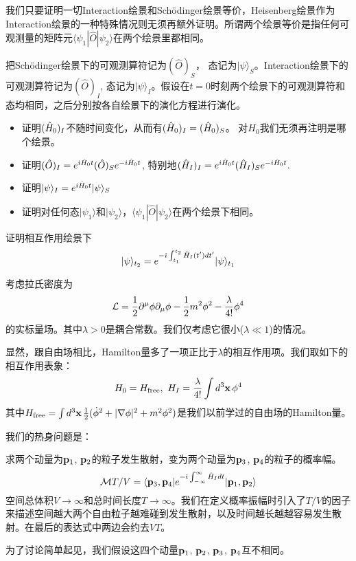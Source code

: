 \documentclass[CJK]{beamer}
\begin{document}
\begin{frame} 
\bch
{\small 
我们只要证明一切Interaction绘景和Sch\"odinger绘景等价，Heisenberg绘景作为Interaction绘景的一种特殊情况则无须再额外证明。所谓两个绘景等价是指任何可观测量的矩阵元$\langle \psi_1 | \hat{O}|\psi_2\rangle$在两个绘景里都相同。
\skipline

把Sch\"odinger绘景下的可观测算符记为$(\hat{O})_S$， 态记为$|\psi\rangle_S$。Interaction绘景下的可观测算符记为$(\hat{O})_I$, 态记为$|\psi\rangle_I$。假设在$t=0$时刻两个绘景下的可观测算符和态均相同，之后分别按各自绘景下的演化方程进行演化。
\begin{itemize}
\item{证明$({\hat{H}}_0)_I$不随时间变化，从而有$({\hat{H}}_0)_I=({\hat{H}}_0)_S$。 对$H_0$我们无须再注明是哪个绘景。}
\item{证明$(\hat{O})_I = e^{{\dot{\imath}}{\hat{H}}_0 t}(\hat{O})_S e^{-{\dot{\imath}}{\hat{H}}_0 t}$, 特别地$({\hat{H}}_I)_I= e^{{\dot{\imath}}{\hat{H}}_0 t}({\hat{H}}_I)_S e^{-{\dot{\imath}}{\hat{H}}_0 t}$.}
\item{证明$|\psi\rangle_I = e^{{\dot{\imath}}{\hat{H}}_0 t} |\psi\rangle_S $}
\item{证明对任何态$|\psi_1\rangle$和$|\psi_2\rangle$，$\langle \psi_1 | \hat{O}|\psi_2\rangle$在两个绘景下相同。}
\end{itemize}
}
\ech
\end{frame}

\begin{frame} 
\bch
证明相互作用绘景下
$$|\psi\rangle_{t_2} = e^{-{\dot{\imath}}\int_{t_1}^{t_2} {\hat{H}}_I(t') dt'} |\psi\rangle_{t_1}$$
\ech
\end{frame}


\begin{frame} 
\bch
考虑拉氏密度为
$${\mathcal{L}} = \frac{1}{2}\partial^\mu\phi\partial_\mu\phi - \frac{1}{2}m^2\phi^2 - \frac{\lambda}{4!}\phi^4$$
的实标量场。其中$\lambda>0$是耦合常数。我们仅考虑它很小($\lambda \ll 1$)的情况。

显然，跟自由场相比，Hamilton量多了一项正比于$\lambda$的相互作用项。我们取如下的相互作用表象：
$$ H_0 = H_{\rm free},\ H_I = \frac{\lambda}{4!} \int d^3{\mathbf{x}}\, \phi^4$$
其中$H_{\rm free} = \int d^3{\mathbf{x}}\, \frac{1}{2}(\dot\phi^2 + |\nabla \phi|^2 + m^2\phi^2)$是我们以前学过的自由场的Hamilton量。

\ech
\end{frame}

\begin{frame} 
\bch
我们的热身问题是：

求两个动量为${\mathbf{p}}_1$, ${\mathbf{p}}_2$的粒子发生散射，变为两个动量为${\mathbf{p}}_3$, ${\mathbf{p}}_4$的粒子的概率幅。
$${\mathcal{M}} T/V= \langle {\mathbf{p}}_3, {\mathbf{p}}_4|  e^{-{\dot{\imath}}\int_{-\infty}^\infty \hat{H}_I dt}|{\mathbf{p}}_1,{\mathbf{p}}_2\rangle$$
空间总体积$V\rightarrow \infty$和总时间长度$T\rightarrow \infty$。我们在定义概率振幅时引入了$T/V$的因子来描述空间越大两个自由粒子越难碰到发生散射，以及时间越长越越容易发生散射。在最后的表达式中两边会约去$VT$。

为了讨论简单起见，我们假设这四个动量${\mathbf{p}}_1$, ${\mathbf{p}}_2$, ${\mathbf{p}}_3$, ${\mathbf{p}}_4$互不相同。
\ech
\end{frame}
\end{document}
